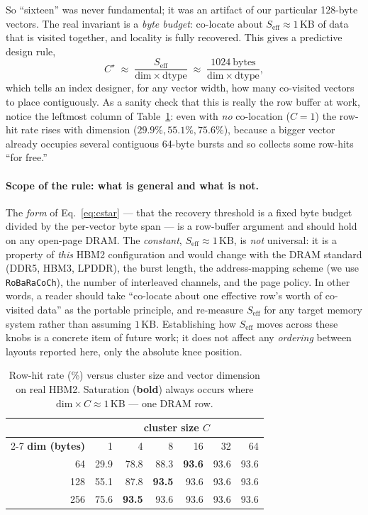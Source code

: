 \documentclass[11pt,a4paper]{article}
\begin{document}
So ``sixteen'' was never fundamental; it was an artifact of our particular
128-byte vectors. The real invariant is a \emph{byte budget}: co-locate about
$S_\text{eff}\approx1$\,KB of data that is visited together, and locality is
fully recovered. This gives a predictive design rule,
\begin{equation}
C^\star \;\approx\; \frac{S_\text{eff}}{\mathrm{dim}\times\mathrm{dtype}}
\;\approx\; \frac{1024\ \text{bytes}}{\mathrm{dim}\times\mathrm{dtype}},
\label{eq:cstar}
\end{equation}
which tells an index designer, for any vector width, how many co-visited vectors
to place contiguously. As a sanity check that this is really the row buffer at
work, notice the leftmost column of Table~\ref{tab:bytelaw}: even with
\emph{no} co-location ($C{=}1$) the row-hit rate rises with dimension
($29.9\%, 55.1\%, 75.6\%$), because a bigger vector already occupies several
contiguous 64-byte bursts and so collects some row-hits ``for free.''

\paragraph{Scope of the rule: what is general and what is not.} The \emph{form}
of Eq.~\ref{eq:cstar} --- that the recovery threshold is a fixed byte budget
divided by the per-vector byte span --- is a row-buffer argument and should hold
on any open-page DRAM. The \emph{constant}, $S_\text{eff}\approx1$\,KB, is
\emph{not} universal: it is a property of \emph{this} HBM2 configuration and
would change with the DRAM standard (DDR5, HBM3, LPDDR), the burst length, the
address-mapping scheme (we use \texttt{RoBaRaCoCh}), the number of interleaved
channels, and the page policy. In other words, a reader should take ``co-locate
about one effective row's worth of co-visited data'' as the portable principle,
and re-measure $S_\text{eff}$ for any target memory system rather than assuming
$1$\,KB. Establishing how $S_\text{eff}$ moves across these knobs is a concrete
item of future work; it does not affect any \emph{ordering} between layouts
reported here, only the absolute knee position.

\begin{table}[h]
\centering
\renewcommand{\arraystretch}{1.2}
\begin{tabular}{rrrrrrr}
\toprule
 & \multicolumn{6}{c}{\textbf{cluster size $C$}} \\
\cmidrule(l){2-7}
\textbf{dim (bytes)} & 1 & 4 & 8 & 16 & 32 & 64 \\
\midrule
64  & 29.9 & 78.8 & 88.3 & \textbf{93.6} & 93.6 & 93.6 \\
128 & 55.1 & 87.8 & \textbf{93.5} & 93.6 & 93.6 & 93.6 \\
256 & 75.6 & \textbf{93.5} & 93.6 & 93.6 & 93.6 & 93.6 \\
\bottomrule
\end{tabular}
\caption{Row-hit rate (\%) versus cluster size and vector dimension on real HBM2.
Saturation (\textbf{bold}) always occurs where $\mathrm{dim}\times C\approx1$\,KB
--- one DRAM row.}
\label{tab:bytelaw}
\end{table}
\end{document}
